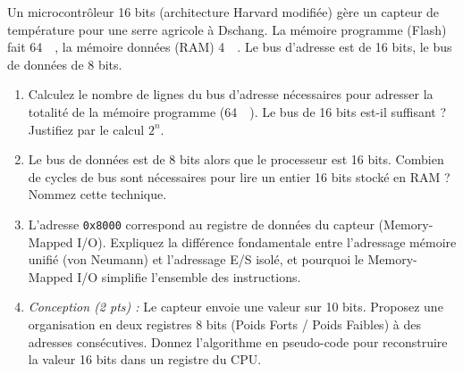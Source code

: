 \documentclass[11pt]{article}
\begin{document}
\begin{exercice}
Un microcontrôleur 16 bits (architecture Harvard modifiée) gère un capteur de température pour une serre agricole à Dschang. La mémoire programme (Flash) fait \SI{64}{\kibi\byte}, la mémoire données (RAM) \SI{4}{\kibi\byte}. Le bus d'adresse est de 16 bits, le bus de données de 8 bits.
\begin{enumerate}
    \item Calculez le nombre de lignes du bus d'adresse nécessaires pour adresser la totalité de la mémoire programme (\SI{64}{\kibi\byte}). Le bus de 16 bits est-il suffisant ? Justifiez par le calcul $2^n$.
    \item Le bus de données est de 8 bits alors que le processeur est 16 bits. Combien de cycles de bus sont nécessaires pour lire un entier 16 bits stocké en RAM ? Nommez cette technique.
    \item L'adresse \texttt{0x8000} correspond au registre de données du capteur (Memory-Mapped I/O). Expliquez la différence fondamentale entre l'adressage mémoire unifié (von Neumann) et l'adressage E/S isolé, et pourquoi le \og Memory-Mapped I/O \fg simplifie l'ensemble des instructions.
    \item \textit{Conception (2 pts) :} Le capteur envoie une valeur sur 10 bits. Proposez une organisation en deux registres 8 bits (Poids Forts / Poids Faibles) à des adresses consécutives. Donnez l'algorithme en pseudo-code pour reconstruire la valeur 16 bits dans un registre du CPU.
\end{enumerate}
\end{exercice}
\end{document}

